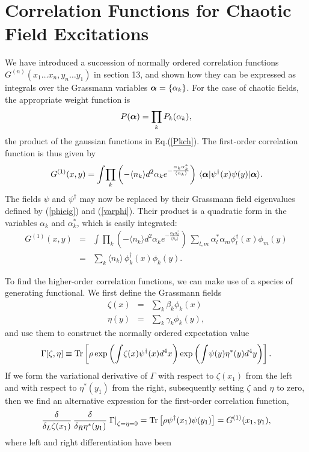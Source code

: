 \documentclass[12pt]{article}
\def\beq{\begin{equation}}
\def\eeq{\end{equation}}
\def\bea{\begin{eqnarray}}
\def\eea{\end{eqnarray}}
\def\a{\alpha}
\def\ba{{\mbox{\boldmath$\alpha$}}}
\def\sa{\alpha^*}
\def\b{\beta}
\def\c{\gamma}
\def\d{\delta}
\def\nn{\nonumber}
\def\dgr{\dagger}
\def\Tr{{\rm Tr}}
\def\eivs{eigenvalues }
\begin{document}
\section{Correlation Functions for Chaotic Field Excitations}
We have introduced a succession of normally ordered
correlation functions $ G^{(n)} ( x_1 \dots x_n , y_n \dots y_1 ) $
in section 13, and shown how they can be expressed 
as integrals over the Grassmann variables
$ \ba = \{ \a_k \} $.
For the case of chaotic fields, the appropriate weight function is 
\beq
P( \ba ) = \prod_k P_k( \a_k ) ,
\label {Pch}
\eeq
the product of the gaussian functions in Eq.(\ref {Pkch}).
The first-order correlation function is thus given by
\beq
G^{(1)} ( x , y ) = 
\int \! \prod_k \left( - \langle n_k \rangle d^2 \a_k
e^ { - \frac{ \a_k \sa_k }{ \langle n_k \rangle } } \right) \,
\langle \ba | \psi^\dgr( x ) \psi( y ) | \ba \rangle .
\label {G1ch}
\eeq
The fields $ \psi $ and $ \psi^\dgr $ may now be replaced
by their Grassmann field \eivs defined by (\ref {phieig}) 
and (\ref {varphi}).
Their product is a quadratic form
in the variables $ \a_k $ and $ \sa_k $,
which is easily integrated:
\bea
G^{(1)} ( x , y ) & = &
\int \! \prod_k \left( - \langle n_k \rangle d^2 \a_k
e^ { - \frac{ \a_k \sa_k }{ \langle n_k \rangle } } \right) \,
\sum_{l,m} \sa_l \a_m \phi_l^\dgr( x ) \phi_m( y ) \nn\\
& = & \sum_k \langle n_k \rangle \, \phi_k^\dgr( x ) \phi_k( y ) .
\label {G1phis}
\eea
\par
To find the higher-order correlation functions,
we can make use of a species of generating functional.
We first define the Grassmann fields
\bea
\zeta( x ) & = & \sum_k \b_k \phi_k( x ) \\
\eta( y ) & = & \sum_k \c_k \phi_k( y ) ,
\label {xeta}
\eea
and use them to construct the normally ordered
expectation value
\beq
\Gamma [ \zeta , \eta ] \equiv
\Tr \left[ \rho \exp \left( \int \! \zeta( x ) \psi^\dgr ( x ) d^4x \right)
\exp \left( \int \! \psi ( y ) \eta^*( y ) d^4y \right) \right] .
\label {Gamma}
\eeq
If we form the variational derivative of $ \Gamma $
with respect to $ \zeta( x_1 ) $ from the left 
and with respect to $ \eta^*( y_1 ) $ from the right,
subsequently setting $ \zeta $ and $ \eta $ to zero, 
then we find an alternative expression for the
first-order correlation function,
\beq
\frac{ \d }{ \d_L \zeta( x_1 ) }
\, \frac{ \d }{ \d_R \eta^*( y_1 ) } \left.
\Gamma \right|_{\zeta =\eta=0}
= \Tr \left[ \rho \psi^\dgr( x_1 ) \psi( y_1 ) \right]
= G^{(1)} ( x_1 , y_1 ) ,
\label {G1Gamma}
\eeq  
where left and right differentiation have been
\end{document}
